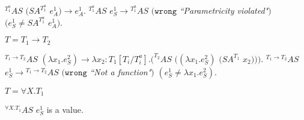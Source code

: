 \begin{case}
\begin{subcase}
$^{T_{1}^{a}}AS$ $(SA^{T_{1}^{a}}$ $e_{A}^{1})\rightarrow e_{A}^{1}$.  $^{T_{1}^{a}}AS$ $e_{S}^{1}\rightarrow{^{T_{1}^{a}}A}S$ $(\mathtt{wrong}$ \emph{``Parametricity violated"}$)$ $(e_{S}^{1}\neq SA^{T_{1}^{a}}$ $e_{A}^{1})$.

\end{subcase}

\begin{subcase}

$T=T_{1}\rightarrow T_{2}$

$^{T_{1}\rightarrow T_{2}}AS$ $(\lambda x_{1}.e_{S}^{2})\rightarrow\lambda x_{2}:T_{1}[T_{i}/T^{a}_{i}].(^{T_{2}}AS$ $((\lambda x_{1}.e_{S}^{2})$ $(SA^{T_{1}}$ $x_{2})))$.  $^{T_{1}\rightarrow T_{2}}AS$ $e_{S}^{1}\rightarrow{^{T_{1}\rightarrow T_{2}}A}S$ $(\mathtt{wrong}$ \emph{``Not a function"}$)$ $(e_{S}^{1}\neq\lambda x_{1}.e_{S}^{2})$.

\end{subcase}

\begin{subcase}

$T=\forall X.T_{1}$

$^{\forall X.T_{1}}AS$ $e_{S}^{1}$ is a value.

\end{subcase}

\end{case}